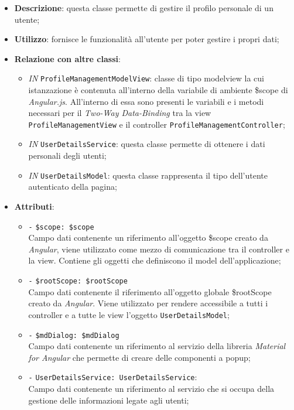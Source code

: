 \begin{itemize}
	\item \textbf{Descrizione}: questa classe permette di gestire il profilo personale di un utente; 
	\item \textbf{Utilizzo}: fornisce le funzionalità all'utente per poter gestire i propri dati;
	\item \textbf{Relazione con altre classi}:
	\begin{itemize}
		\item \textit{IN} \texttt{ProfileManagementModelView}: classe di tipo modelview la cui istanzazione è contenuta all'interno della variabile di ambiente \$scope di \textit{Angular.js}. All'interno di essa sono presenti le variabili e i metodi necessari per il \textit{Two-Way Data-Binding} tra la view \texttt{ProfileManagementView} e il controller \texttt{ProfileManagementController};
		\item \textit{IN} \texttt{UserDetailsService}: questa classe permette di ottenere i dati personali degli utenti;
		\item \textit{IN} \texttt{UserDetailsModel}: questa classe rappresenta il tipo dell'utente autenticato della pagina; 
	\end{itemize}
	\item \textbf{Attributi}:
	\begin{itemize}
		\item \texttt{-} \texttt{\$scope: \$scope} \\
		Campo dati contenente un riferimento all’oggetto \$scope creato da \textit{Angular}, viene utilizzato come mezzo di comunicazione tra il controller e la view. Contiene gli oggetti che definiscono il model dell’applicazione;
		\item \texttt{-} \texttt{\$rootScope: \$rootScope} \\
		Campo dati contenente il riferimento all'oggetto globale \$rootScope creato da \textit{Angular}. Viene utilizzato per rendere accessibile a tutti i controller e a tutte le view l'oggetto \texttt{UserDetailsModel};
		\item \texttt{-} \texttt{\$mdDialog: \$mdDialog} \\
		Campo dati contenente un riferimento al servizio della libreria \textit{Material for Angular} che permette di creare delle componenti a popup;		
		\item \texttt{-} \texttt{UserDetailsService: UserDetailsService}: \\
		Campo dati contenente un riferimento al servizio che si occupa della gestione delle informazioni legate agli utenti;

\end{itemize}
\end{itemize}
